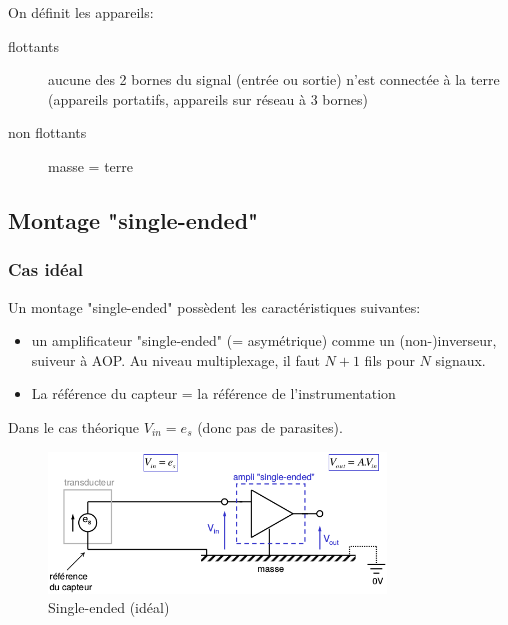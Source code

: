 On définit les appareils:
\begin{description}
	\item[flottants] aucune des 2 bornes du signal (entrée ou sortie) n'est connectée à la terre (appareils portatifs, appareils sur réseau à 3 bornes)
	\item[non flottants] masse = terre
\end{description}
\subsection{Montage "single-ended"}
\subsubsection{Cas idéal}
Un montage "single-ended" possèdent les caractéristiques suivantes:
\begin{itemize}
\item un amplificateur "single-ended" (= asymétrique) comme un (non-)inverseur, suiveur à AOP. Au niveau multiplexage, il faut \(N+1\) fils pour \(N\) signaux. \item La référence du capteur = la référence de l'instrumentation
\end{itemize} 
Dans le cas théorique \(V_{in}=e_s\) (donc pas de parasites).
\begin{figure}[H] 
	\centering 
	\includegraphics[width=0.8\textwidth,height=10\baselineskip,keepaspectratio]{ch3/image11} 
	\caption{Single-ended (idéal)} 
\end{figure}
